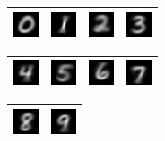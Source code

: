 \begin{table}[h!]
\begin{tabular}{|c|c|c|c|}
	\hline
	\includegraphics[scale=4.0]{exp6/digit0} &
	\includegraphics[scale=4.0]{exp6/digit1} &
	\includegraphics[scale=4.0]{exp6/digit2} &
	\includegraphics[scale=4.0]{exp6/digit3} \\
	\hline
\end{tabular}
\begin{tabular}{|c|c|c|c|}
	\hline
	\includegraphics[scale=4.0]{exp6/digit4} &
	\includegraphics[scale=4.0]{exp6/digit5} &
	\includegraphics[scale=4.0]{exp6/digit6} &
	\includegraphics[scale=4.0]{exp6/digit7} \\
	\hline
\end{tabular}
\begin{tabular}{|c|c|}
	\hline
	\includegraphics[scale=4.0]{exp6/digit8} &
	\includegraphics[scale=4.0]{exp6/digit9} \\
	\hline
\end{tabular}
\end{table}


